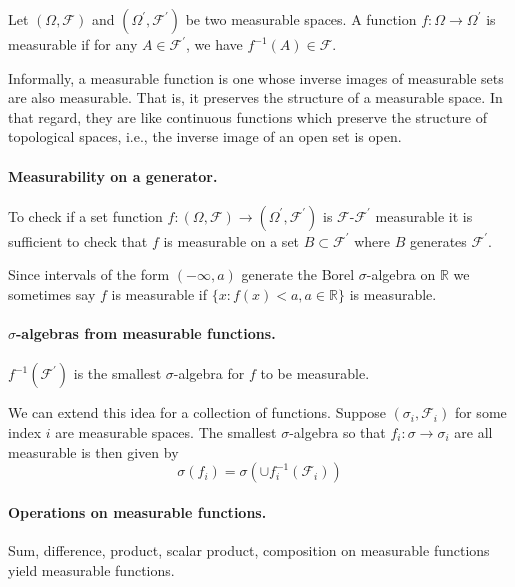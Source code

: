 \documentclass[12pt,english,oneside]{scrbook}
\numberwithin{equation}{chapter}
\theoremstyle{definition}
\theoremstyle{plain}
\begin{document}
Let $(\Omega, \mathcal{F})$ and $(\Omega^\prime, \mathcal{F}^\prime)$ be two measurable spaces. A function $f:\Omega \to \Omega^\prime$ is measurable if for any $A\in \mathcal{F}^\prime$, we have $f^{-1}(A) \in \mathcal{F}$.

Informally, a measurable function is one whose inverse images of measurable sets are also measurable. That is, it preserves the structure of a measurable space. In that regard, they are like continuous functions which preserve the structure of topological spaces, i.e., the inverse image of an open set is open.

\paragraph{Measurability on a generator.}

To check if a set function $f:(\Omega, \mathcal{F})\to(\Omega^\prime, \mathcal{F}^\prime)$ is $\mathcal{F}$-$\mathcal{F}^\prime$ measurable it is sufficient
to check that $f$ is measurable on a set $B\subset \mathcal{F}^\prime$ where $B$ generates $\mathcal{F}^\prime$.

Since intervals of the form $(-\infty, a)$ generate the Borel $\sigma$-algebra on $\mathbb{R}$ we sometimes say $f$ is measurable if $\{x: f(x)<a, a\in \mathbb{R} \}$ is measurable.

\paragraph{$\sigma$-algebras from measurable functions.}

$f^{-1}(\mathcal{F}^\prime)$ is the smallest $\sigma$-algebra for $f$ to be measurable.

We can extend this idea for a collection of functions. Suppose $(\sigma_i,
\mathcal{F}_i)$ for some index $i$ are measurable spaces. The smallest $\sigma$-algebra so that $f_i : \sigma \to \sigma_i$ are all measurable is then given by
\begin{equation}
  \sigma(f_i) = \sigma (\cup f_i^{-1}(\mathcal{F}_i))
\end{equation}

\paragraph{Operations on measurable functions.}

Sum, difference, product, scalar product, composition on measurable functions yield measurable functions.
\end{document}

